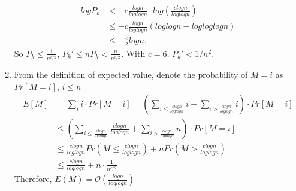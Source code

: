\documentclass{assignment}
\begin{document}
\begin{homeworkProblem}
\begin{enumerate}
	\begin{equation*}
	\begin{aligned}
	logP_k &< -c\frac{logn}{loglogn} \cdot log(\frac{clogn}{loglogn}) \\
	& \leq -c\frac{logn}{loglogn}(loglogn - logloglogn) \\
	& \leq -\frac{c}{2}logn.
	\end{aligned}
	\end{equation*}
	So $P_k \leq \frac{1}{n^{c/2}}$, $P_k' \leq nP_k < \frac{n}{n^{c/2}}$. With $c = 6$, $P_k' < 1/n^2$.
	
	\item From the definition of expected value, denote the probability of $M=i$ as $Pr[M=i]$, $i\leq n$
	\begin{equation*}
	\begin{aligned}
	E[M]&= \sum_i i \cdot Pr[M=i] = (\sum_{i\leq \frac{clogn}{loglogn}} i + \sum_{i>\frac{clogn}{loglogn}} i )\cdot Pr[M=i] \\
	&\leq (\sum_{i\leq \frac{clogn}{loglogn}} \frac{clogn}{loglogn}  + \sum_{i>\frac{clogn}{loglogn}} n )\cdot Pr[M=i] \\
	& \leq \frac{clogn}{loglogn}Pr(M\leq \frac{clogn}{loglogn}) + nPr(M> \frac{clogn}{loglogn})\\
	& \leq \frac{clogn}{loglogn} +  n \cdot \frac{1}{n^{c/2}}
	\end{aligned}
	\end{equation*}
	Therefore, $E(M) = \mathcal{O} (\frac{logn}{loglogn})$
	
	
	
	\end{enumerate}
    	
    \end{homeworkProblem}
    
\end{document}
